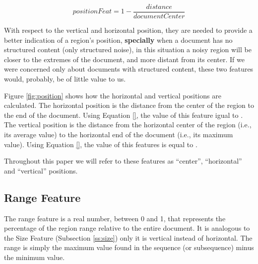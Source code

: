 \begin{equation}\label{eq:position}
    positionFeat = 1 - \frac{distance}{documentCenter}
\end{equation}

With respect to the vertical and horizontal position, they are needed to provide
a better indication of a region's position, \textbf{specially} when a document
has no structured content (only structured noise), in this situation a noisy region
will be closer to the extremes of the document, and more distant from its
center. If we were concerned only about documents with structured content, these
two features would, probably, be of little value to us. 

Figure \ref{fig:position} shows how the horizontal and vertical positions are
calculated. The horizontal position is the distance from the center of the
region to the end of the document. Using Equation \ref{}, the value of this
feature igual to $ $. The vertical position is the distance from the horizontal
center of the region (i.e., its average value) to the horizontal end of the
document (i.e., its maximum value). Using Equation \ref{}, the value of this
features is equal to $ $.

Throughout this paper we will refer to these features as ``center'',
``horizontal'' and ``vertical'' positions.

\subsection{Range Feature}\label{ss:range}
The range feature is a real number, between 0 and 1, that represents the
percentage of the region range relative to the entire document. It is analogous
to the Size Feature (Subsection \ref{ss:size}) only it is vertical instead of
horizontal. The range is simply the maximum value found in the sequence (or
subsequence) minus the minimum value.

